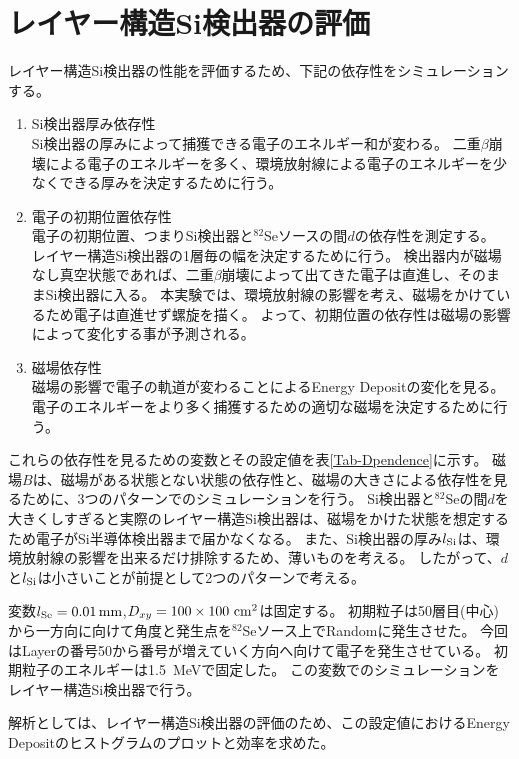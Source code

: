 \documentclass[a4paper,10pt]{jreport}
\begin{document}
\section{レイヤー構造Si検出器の評価}

レイヤー構造Si検出器の性能を評価するため、下記の依存性をシミュレーションする。

\begin{enumerate}
	\item Si検出器厚み依存性 \\
	Si検出器の厚みによって捕獲できる電子のエネルギー和が変わる。
	二重$\beta$崩壊による電子のエネルギーを多く、環境放射線による電子のエネルギーを少なくできる厚みを決定するために行う。
	
	\item 電子の初期位置依存性 \\
	電子の初期位置、つまりSi検出器と$^{82}$Seソースの間$d$の依存性を測定する。
	レイヤー構造Si検出器の1層毎の幅を決定するために行う。
	検出器内が磁場なし真空状態であれば、二重$\beta$崩壊によって出てきた電子は直進し、そのままSi検出器に入る。
	本実験では、環境放射線の影響を考え、磁場をかけているため電子は直進せず螺旋を描く。
	よって、初期位置の依存性は磁場の影響によって変化する事が予測される。
	
	\item 磁場依存性 \\
	磁場の影響で電子の軌道が変わることによるEnergy Depositの変化を見る。
	電子のエネルギーをより多く捕獲するための適切な磁場を決定するために行う。
\end{enumerate}

これらの依存性を見るための変数とその設定値を表\ref{Tab-Dpendence}に示す。
磁場$B$は、磁場がある状態とない状態の依存性と、磁場の大きさによる依存性を見るために、3つのパターンでのシミュレーションを行う。
Si検出器と$^{82}$Seの間$d$を大きくしすぎると実際のレイヤー構造Si検出器は、磁場をかけた状態を想定するため電子がSi半導体検出器まで届かなくなる。
また、Si検出器の厚み$l_{\rm{Si}}$は、環境放射線の影響を出来るだけ排除するため、薄いものを考える。
したがって、$d$と$l_{\rm{Si}}$は小さいことが前提として2つのパターンで考える。

変数$l_{\rm{Se}} = \SI{0.01}{mm}$,$D_{xy} =100\times100\ \rm{cm}^2$は固定する。
初期粒子は50層目(中心)から一方向に向けて角度と発生点を$^{82}$Seソース上でRandomに発生させた。
今回はLayerの番号50から番号が増えていく方向へ向けて電子を発生させている。
初期粒子のエネルギーは\SI{1.5}{MeV}で固定した。
この変数でのシミュレーションをレイヤー構造Si検出器で行う。

解析としては、レイヤー構造Si検出器の評価のため、この設定値におけるEnergy Depositのヒストグラムのプロットと効率を求めた。
\end{document}
